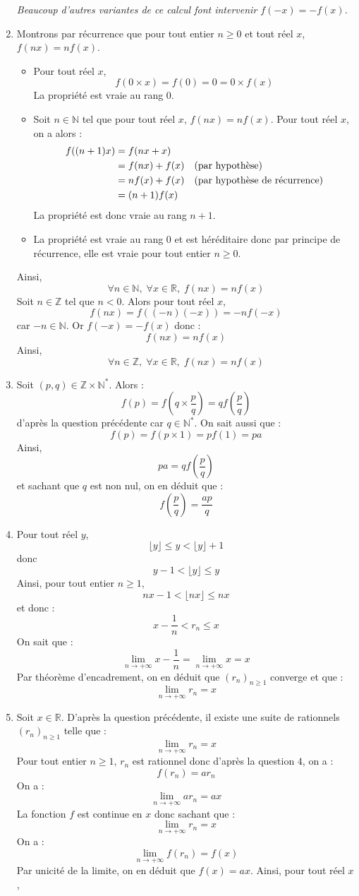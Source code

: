 \documentclass[a4paper,twoside,french,10pt]{VcCours}
\begin{document}
\begin{enumerate}
\emph{Beaucoup d'autres variantes de ce calcul font intervenir $f(-x)=-f(x)$.}
\item Montrons par récurrence que pour tout entier $n \geq 0$ et tout réel $x$, $f(nx)=nf(x)$.
\begin{itemize}
\item Pour tout réel $x$,
$$ f(0 \times x)= f(0)=0 = 0 \times f(x)$$
La propriété est vraie au rang $0$.
\item Soit $n \in \mathbb{N}$ tel que pour tout réel $x$, $f(nx)=nf(x)$. Pour tout réel $x$, on a alors :
\begin{align*}
f((n+1)x) & = f(nx+x) \\
& = f(nx)+f(x) \quad \hbox{(par hypothèse)} \\
& = nf(x)+f(x) \quad \hbox{(par hypothèse de récurrence)} \\
& = (n+1)f(x)
\end{align*}
La propriété est donc vraie au rang $n+1$.
\item La propriété est vraie au rang $0$ et est héréditaire donc par principe de récurrence, elle est vraie pour tout entier $n \geq 0$.
\end{itemize}
Ainsi,
$$ \boxed{\forall n \in \mathbb{N}, \; \forall x \in \mathbb{R}, \; f(nx)=nf(x)}$$
Soit $n \in \mathbb{Z}$ tel que $n<0$. Alors pour tout réel $x$,
$$ f(nx)=f((-n)(-x)) = -n f(-x)$$
car $-n \in \mathbb{N}$. Or $f(-x)=-f(x)$ donc :
$$ f(nx)=nf(x)$$
Ainsi,
$$ \boxed{\forall n \in \mathbb{Z}, \; \forall x \in \mathbb{R}, \; f(nx)=nf(x)}$$
\item Soit $(p,q) \in \mathbb{Z} \times \mathbb{N}^*$. Alors :
$$ f(p) = f \left( q \times \dfrac{p}{q} \right) = 	q f \left( \dfrac{p}{q} \right)$$
d'après la question précédente car $q \in \mathbb{N}^*$. On sait aussi que :
$$ f(p)= f(p \times 1)= p f(1)=pa$$
Ainsi,
$$ pa = q f \left( \dfrac{p}{q} \right)$$
et sachant que $q$ est non nul, on en déduit que :
$$ \boxed{f \left( \dfrac{p}{q} \right) = \dfrac{ap}{q}}$$
\item Pour tout réel $y$,
$$ \lfloor y \rfloor \leq y < \lfloor y \rfloor + 1$$
donc 
$$ y-1<  \lfloor y \rfloor \leq y$$
Ainsi, pour tout entier $n \geq 1$,
$$  nx-1<  \lfloor nx \rfloor \leq nx$$
et donc :
$$ x- \dfrac{1}{n} < r_n \leq x$$
On sait que :
$$ \lim_{n \rightarrow + \infty} x- \dfrac{1}{n} =  \lim_{n \rightarrow + \infty} x=x$$
Par théorème d'encadrement, on en déduit que $(r_n)_{n \geq 1}$ converge et que :
$$ \boxed{\lim_{n \rightarrow + \infty} r_n = x}$$
\item Soit $x \in \mathbb{R}$. D'après la question précédente, il existe une suite de rationnels $(r_n)_{n \geq 1}$ telle que :
$$ \lim_{n \rightarrow + \infty} r_n = x$$
Pour tout entier $n \geq 1$, $r_n$ est rationnel donc d'après la question $4$, on a :
$$ f(r_n) = a r_n$$
On a :
$$  \lim_{n \rightarrow + \infty} a r_n =a x$$
La fonction $f$ est continue en $x$ donc sachant que :
$$  \lim_{n \rightarrow + \infty} r_n = x$$
On a :
$$  \lim_{n \rightarrow + \infty} f(r_n) = f(x)$$
Par unicité de la limite, on en déduit que $f(x)=ax$. Ainsi, pour tout réel $x$,
\end{enumerate}
\end{document}
